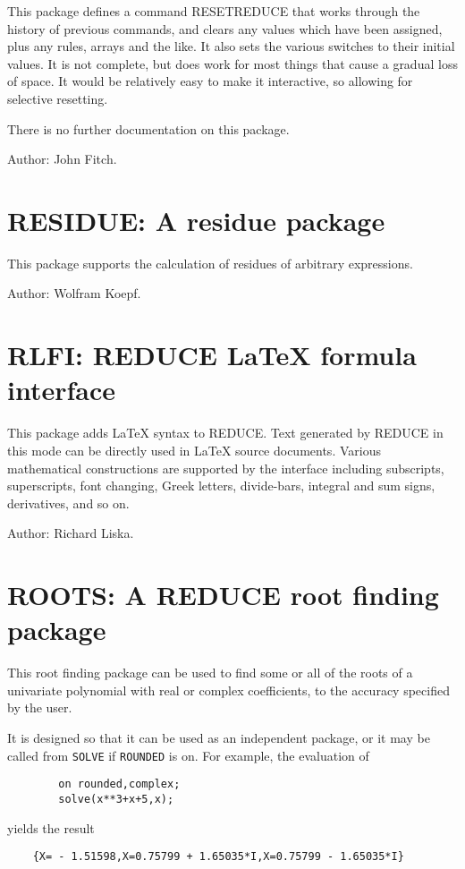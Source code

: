 This package defines a command RESETREDUCE that works through the
history of previous commands, and clears any values which have been
assigned, plus any rules, arrays and the like.  It also sets the various
switches to their initial values.  It is not complete, but does work for
most things that cause a gradual loss of space.  It would be relatively
easy to make it interactive, so allowing for selective resetting.

There is no further documentation on this package.

Author: John Fitch.

\section{RESIDUE: A residue package} 

This package supports the calculation of residues of arbitrary
expressions.

Author: Wolfram Koepf.

\section{RLFI: REDUCE LaTeX formula interface} 

This package adds \LaTeX{} syntax to REDUCE.  Text generated by REDUCE in
this mode can be directly used in \LaTeX{} source documents.  Various
mathematical constructions are supported by the interface including
subscripts, superscripts, font changing, Greek letters, divide-bars,
integral and sum signs, derivatives, and so on.

Author: Richard Liska.

\section{ROOTS: A REDUCE root finding package} 

This root finding package can be used to find some or all of the roots of a
univariate polynomial with real or complex coefficients, to the accuracy
specified by the user.

It is designed so that it can be used as an independent package, or it may
be called from {\tt SOLVE} if {\tt ROUNDED} is on. For example,
the evaluation of
\begin{verbatim}
        on rounded,complex;
        solve(x**3+x+5,x);
\end{verbatim}
yields the result
\begin{verbatim}
    {X= - 1.51598,X=0.75799 + 1.65035*I,X=0.75799 - 1.65035*I}
\end{verbatim}

